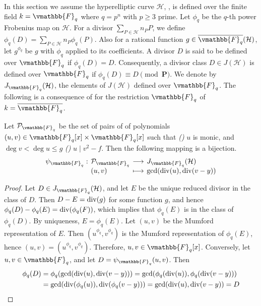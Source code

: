 In this section we assume the hyperelliptic curve $\mathcal{H}$, , 
is defined over the finite field $k = \vmathbb{F}_q$ where $q = p^n$ with $p \ge 3$ prime. Let 
$\phi_q$ be the $q$-th power Frobenius map on $\mathcal{H}$. For a divisor $\sum_{P \in \mathcal{H}} 
n_PP$, we define $\phi_q(D) = \sum_{P \in \mathcal{H}}n_P\phi_q(P)$. Also for a rational function $g 
\in \overline{\vmathbb{F}_q}(\mathcal{H})$, let $g^{\phi_q}$ be $g$ with $\phi_q$ applied to its 
coefficients. A divisor $D$ is said to be defined over $\vmathbb{F}_q$ if $\phi_q(D) = D$. 
Consequently, a divisor class $D \in J(\mathcal{H})$ is defined over $\vmathbb{F}_q$ if $\phi_q(D) 
\equiv D \pmod {\mathbf{P}}$. We denote by $J_{\vmathbb{F}_q}(\mathcal{H})$, the elements of 
$J(\mathcal{H})$ defined over $\vmathbb{F}_q$. The following is a consequence of 
 for the restriction $\vmathbb{F}_q$ of $k = \overline{\vmathbb{F}_q}$.
\begin{proposition}
Let $\mathcal{P}_{\vmathbb{F}_q}$ be the set of pairs of of polynomials $(u, v) \in \vmathbb{F}_q[x] 
\times \vmathbb{F}_q[x]$ such that \emph{()} $u$ is monic, and $\deg v < \deg u \le g$ 
\emph{()} $u \mid v^2 - f$. Then the following mapping is a bijection.
\begin{equation}
\label{equation:Mum-corr-fq}
\setlength\arraycolsep{2pt}
\begin{array}{llll}
\psi_{\vmathbb{F}_q}: & \mathcal{P}_{\vmathbb{F}_q} & \longrightarrow & J_{\vmathbb{F}_q}(\mathcal{H}) 
\\
& (u, v) & \longmapsto & \gcd(\divisor(u), \divisor(v - y))
\end{array}
\end{equation}
\end{proposition}
\begin{proof}
Let $D \in J_{\vmathbb{F}_q}(\mathcal{H})$, and let $E$ be the unique reduced divisor in the class of 
$D$. Then $D - E = \operatorname{div}(g)$ for some function $g$, and hence $\phi_q(D)- \phi_q(E) = 
\operatorname{div}(\phi_q(F))$, which implies that $\phi_q(E)$ is in the class of $\phi_q(D)$. By uniqueness, 
$E = \phi_q(E)$. Let $(u, v)$ be the Mumford representation of $E$. Then $(u^{\phi_q}, v^{\phi_q})$ 
is the Mumford representation of $\phi_q(E)$, hence $(u, v) = (u^{\phi_q}, v^{\phi_q})$. Therefore, 
$u, v \in \vmathbb{F}_q[x]$. Conversely, let $u, v \in \vmathbb{F}_q$, and let $D = 
\psi_{\vmathbb{F}_q}(u, v)$. Then 
\begin{align*}
\phi_q(D) 
&= \phi_q(\gcd(\operatorname{div}(u), \operatorname{div}(v - y))) = \gcd(\phi_q(\operatorname{div}(u)), \phi_q(\operatorname{div}(v - y))) 
\\
&= \gcd(\operatorname{div}(\phi_q(u)), \operatorname{div}(\phi_q(v - y))) = \gcd(\operatorname{div}(u), \operatorname{div}(v - y)) = D 
\qedhere
\end{align*}
\end{proof}

